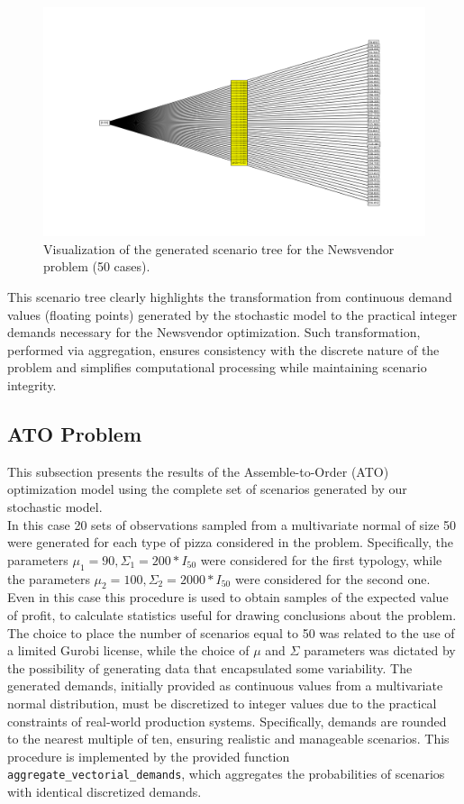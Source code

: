 \documentclass[a4paper,12pt]{article}
\begin{document}
	\begin{figure}[htbp]
		\centering
		\includegraphics[width=1\textwidth]{../immagini/scenariNV.png}
		\caption{Visualization of the generated scenario tree for the Newsvendor problem (50 cases).}
		\label{fig:scenariotree-plot}
	\end{figure}
	
	This scenario tree clearly highlights the transformation from continuous demand values (floating points) generated by the stochastic model to the practical integer demands necessary for the Newsvendor optimization. Such transformation, performed via aggregation, ensures consistency with the discrete nature of the problem and simplifies computational processing while maintaining scenario integrity.
	
	\newpage
	\subsection{ATO Problem}
	
	This subsection presents the results of the Assemble-to-Order (ATO) optimization model using the complete set of scenarios generated by our stochastic model.\\
	
	\noindent In this case 20 sets of observations sampled from a multivariate normal of size 50 were generated for each type of pizza considered in the problem. Specifically, the parameters $\mu_{1} = 90, \Sigma_{1} = 200 * I_{50}$ were considered for the first typology, while the parameters $\mu_{2} = 100, \Sigma_{2} = 2000 * I_{50}$ were considered for the second one. Even in this case this procedure is used to obtain samples of the expected value of profit, to calculate statistics useful for drawing conclusions about the problem. The choice to place the number of scenarios equal to 50 was related to the use of a limited Gurobi license, while the choice of $\mu$ and $\Sigma$ parameters was dictated by the possibility of generating data that encapsulated some variability. The generated demands, initially provided as continuous values from a multivariate normal distribution, must be discretized to integer values due to the practical constraints of real-world production systems. Specifically, demands are rounded to the nearest multiple of ten, ensuring realistic and manageable scenarios. This procedure is implemented by the provided function \texttt{aggregate\_vectorial\_demands}, which aggregates the probabilities of scenarios with identical discretized demands. 
	
\end{document}
